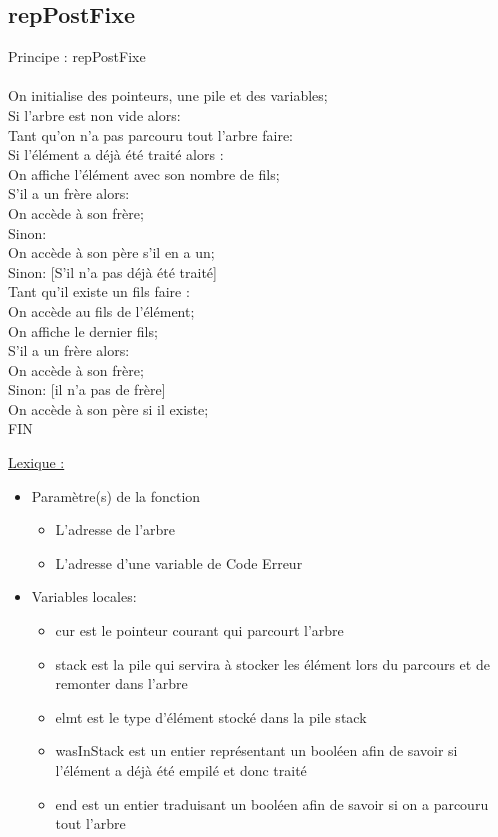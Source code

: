 \documentclass[a4paper]{article}
\newcommand\tab[1][1cm]{\hspace*{#1}}
\begin{document}


\newpage
\subsection{repPostFixe}
\begin{algorithm}
Principe : repPostFixe
\\
\\
\tab On initialise des pointeurs, une pile et des variables;
\\
\tab Si l'arbre est non vide alors:
\\
\tab \tab Tant qu'on n'a pas parcouru tout l'arbre faire:
\\
\tab \tab \tab Si l'élément a déjà été traité alors :
\\
\tab \tab \tab \tab On affiche l'élément avec son nombre de fils;
\\
\tab \tab \tab \tab S'il a un frère alors:
\\
\tab \tab \tab \tab \tab On accède à son frère;
\\
\tab \tab \tab \tab Sinon: 
\\
\tab \tab \tab \tab \tab On accède à son père s'il en a un;
\\
\tab \tab \tab Sinon: [S'il n'a pas déjà été traité]
\\
\tab \tab \tab \tab Tant qu'il existe un fils faire :
\\
\tab \tab \tab \tab \tab On accède au fils de l'élément;
\\
\tab \tab \tab \tab On affiche le dernier fils;
\\
\tab \tab \tab \tab S'il a un frère alors:
\\
\tab \tab \tab \tab \tab On accède à son frère;
\\
\tab \tab \tab \tab Sinon: [il n'a pas de frère]
\\
\tab \tab \tab \tab \tab On accède à son père si il existe;
\\
FIN
\end{algorithm}
\underline{Lexique :}
\begin{itemize}
\item Paramètre(s) de la fonction  
\begin{itemize}
\item L'adresse de l'arbre
\item L'adresse d'une variable de Code Erreur
\end{itemize}
\item Variables locales:
\begin{itemize}
\item cur est le pointeur courant qui parcourt l'arbre
\item stack est la pile qui servira à stocker les élément lors du parcours et de remonter dans l'arbre
\item elmt  est le type d'élément stocké dans la pile stack 
\item wasInStack est un entier représentant un booléen afin de savoir si l'élément a déjà été empilé et donc traité
\item end est un entier traduisant un booléen afin de savoir si on a parcouru tout l'arbre 
\end{itemize}
\end{itemize}
\end{document}
